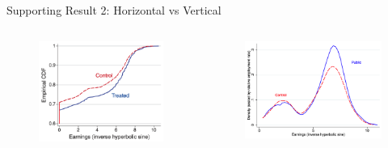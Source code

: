 \begin{frame}{Supporting Result 2: Horizontal vs Vertical}
    \vspace*{-10pt}
    \begin{columns}[T]
        \begin{column}{0.45\textwidth}
            \begin{figure}
                \centering
                \includegraphics[height = 0.6 \textheight]{images/dist_earnings.png}
            \end{figure}
        \end{column}

        \begin{column}{0.45\textwidth}
            \begin{figure}
                \centering
                \includegraphics[height = 0.6 \textheight]{images/dist_earnings_empadj.png}
            \end{figure}
        \end{column}
    \end{columns}
\end{frame}

